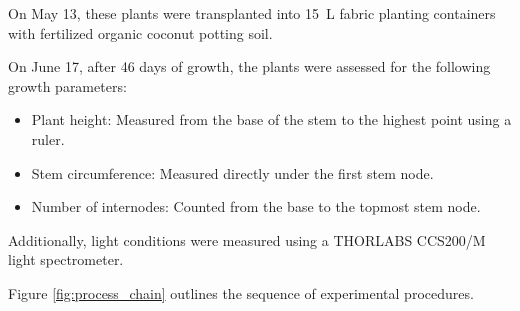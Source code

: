 On May 13, these plants were transplanted into \qty[mode=text]{15}{\L} fabric planting containers with fertilized organic coconut potting soil.

On June 17, after \num[mode=text]{46} days of growth, the plants were assessed for the following growth parameters:
\begin{itemize}
    \item Plant height: Measured from the base of the stem to the highest point using a ruler.
    \item Stem circumference: Measured directly under the first stem node.
    \item Number of internodes: Counted from the base to the topmost stem node.
\end{itemize}

Additionally, light conditions were measured using a THORLABS CCS200/M light spectrometer.

Figure \ref{fig:process_chain} outlines the sequence of experimental procedures.

